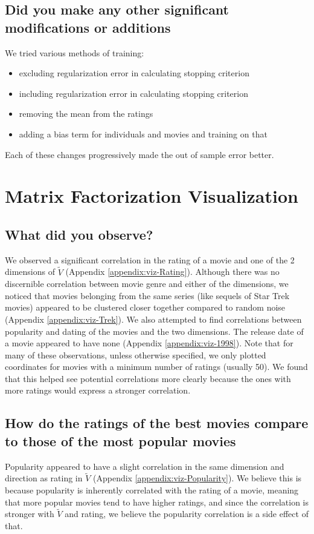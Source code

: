 \subsection*{Did you make any other significant modifications or additions}
We tried various methods of training:
\begin{itemize}
  \item excluding regularization error in calculating stopping criterion
  \item including regularization error in calculating stopping criterion
  \item removing the mean from the ratings
  \item adding a bias term for individuals and movies and training on that
\end{itemize}
Each of these changes progressively made the out of sample error better.

\section{Matrix Factorization Visualization}
\medskip
\subsection*{What did you observe?}
We observed a significant correlation in the rating of a movie and one of the 2 dimensions of $\widetilde{V}$ (Appendix \ref{appendix:viz-Rating}). Although there was no discernible correlation between movie genre and either of the dimensions, we noticed that movies belonging from the same series (like sequels of Star Trek movies) appeared to be clustered closer together compared to random noise (Appendix \ref{appendix:viz-Trek}). We also attempted to find correlations between popularity and dating of the movies and the two dimensions. The release date of a movie appeared to have none (Appendix \ref{appendix:viz-1998}). Note that for many of these observations, unless otherwise specified, we only plotted coordinates for movies with a minimum number of ratings (usually 50). We found that this helped see potential correlations more clearly because the ones with more ratings would express a stronger correlation.

\subsection*{How do the ratings of the best movies compare to those of the most popular movies}
Popularity appeared to have a slight correlation in the same dimension and direction as rating in $\widetilde{V}$ (Appendix \ref{appendix:viz-Popularity}). We believe this is because popularity is inherently correlated with the rating of a movie, meaning that more popular movies tend to have higher ratings, and since the correlation is stronger with $\widetilde{V}$ and rating, we believe the popularity correlation is a side effect of that.

